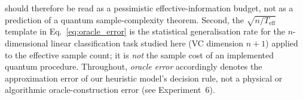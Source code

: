 \documentclass[sensors,article,submit,pdftex,moreauthors]{Definitions/mdpi}
\newcommand{\Teff}{T_{\mathrm{eff}}}
\providecommand{\DIFadd}[1]{{\protect\color{blue}#1}} %
\providecommand{\DIFdel}[1]{} %
\providecommand{\DIFaddbegin}{} %
\providecommand{\DIFaddend}{} %
\providecommand{\DIFdelbegin}{} %
\providecommand{\DIFdelend}{} %
\begin{document}
\DIFdel{than the exact overhead and should }\DIFdelend \DIFaddbegin \DIFadd{should therefore }\DIFaddend be read as a \DIFdelbegin \DIFdel{lower bound on effective information content}\DIFdelend \DIFaddbegin \DIFadd{pessimistic effective-information budget}\DIFaddend , not as a prediction of \DIFdelbegin \DIFdel{the framework's theorems}\DIFdelend \DIFaddbegin \DIFadd{a quantum sample-complexity theorem}\DIFaddend . Second, the $\sqrt{n/\Teff}$ template in Eq.~\eqref{eq:oracle_error} is the statistical generalisation rate for the $n$-dimensional linear classification task studied here (VC dimension $n{+}1$) applied to the effective sample count; it is \DIFdelbegin \DIFdel{not }\DIFdelend \DIFaddbegin \emph{\DIFadd{not}} \DIFaddend the sample cost of \DIFdelbegin \DIFdel{the exact oracle-construction procedure, which for a uniform marginal over $N = 2^n$ inputs scales linearly in $N$}\DIFdelend \DIFaddbegin \DIFadd{an implemented quantum procedure}\DIFaddend . Throughout, \emph{oracle error} accordingly denotes the approximation error of our heuristic model's decision rule, not \DIFdelbegin \DIFdel{the construction error of the exact sketching procedure; the two views coincide numerically at our operating point ($n = 10$, $T = 10^4$) but scale differently in $n$ }\DIFdelend \DIFaddbegin \DIFadd{a physical or algorithmic oracle-construction error }\DIFaddend (see Experiment~6).
\end{document}
